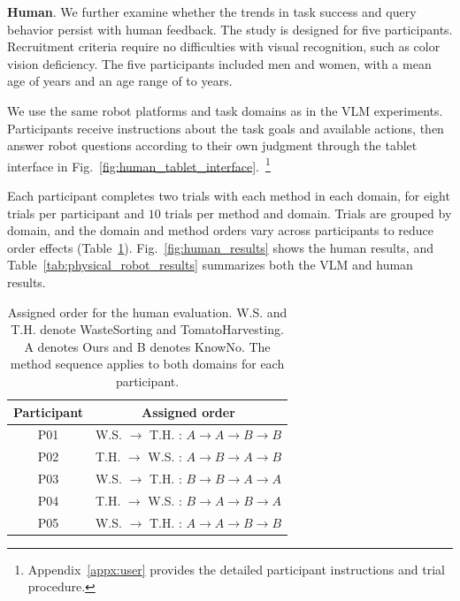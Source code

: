 







\noindent\textbf{Human}\label{exp:human_eval}. We further examine whether the trends in task success and query behavior persist with human feedback. The study is designed for five participants. Recruitment criteria require no difficulties with visual recognition, such as color vision deficiency. The five participants included \cp{[number]} men and \cp{[number]} women, with a mean age of \cp{[mean]} years and an age range of \cp{[minimum]} to \cp{[maximum]} years.

We use the same robot platforms and task domains as in the VLM experiments. Participants receive instructions about the task goals and available actions, then answer robot questions according to their own judgment through the tablet interface in Fig.~\ref{fig:human_tablet_interface}.~\footnote{Appendix~\ref{appx:user} provides the detailed participant instructions and trial procedure.}

Each participant completes two trials with each method in each domain, for eight trials per participant and $10$ trials per method and domain. Trials are grouped by domain, and the domain and method orders vary across participants to reduce order effects (Table~\ref{tab:human_assignment}). Fig.~\ref{fig:human_results} shows the human results, and Table~\ref{tab:physical_robot_results} summarizes both the VLM and human results.

\begin{table}[!htbp]
\centering
\caption{Assigned order for the human evaluation. W.S. and T.H. denote WasteSorting and TomatoHarvesting. A denotes Ours and B denotes KnowNo. The method sequence applies to both domains for each participant.}
\label{tab:human_assignment}
\small
\setlength{\tabcolsep}{3pt}
\begin{tabular*}{\columnwidth}{@{\extracolsep{\fill}}cc@{}}
\toprule
Participant & Assigned order \\
\midrule
P01 & W.S. $\rightarrow$ T.H. : $A\rightarrow A\rightarrow B\rightarrow B$ \\
P02 & T.H. $\rightarrow$ W.S. : $A\rightarrow B\rightarrow A\rightarrow B$ \\
P03 & W.S. $\rightarrow$ T.H. : $B\rightarrow B\rightarrow A\rightarrow A$ \\
P04 & T.H. $\rightarrow$ W.S. : $B\rightarrow A\rightarrow B\rightarrow A$ \\
P05 & W.S. $\rightarrow$ T.H. : $A\rightarrow A\rightarrow B\rightarrow B$ \\
\bottomrule
\end{tabular*}
\end{table}

